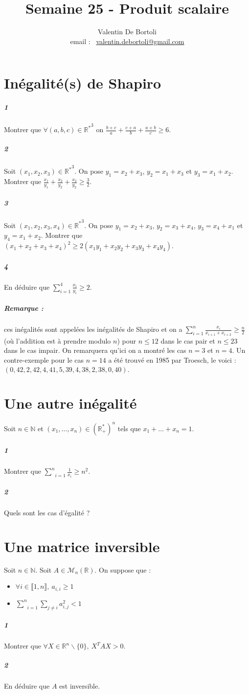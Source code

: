 \documentclass[10pt,a4paper]{article}
\title{Semaine 25 - Produit scalaire}
\author{Valentin De Bortoli \\ email : \ \href{mailto:valentin.debortoli@gmail.com}{valentin.debortoli@gmail.com}}
\date{}
\begin{document}
\maketitle
\section{Inégalité(s) de Shapiro}
\subparagraph{1}Montrer que $\forall (a,b,c) \in {\mathbb{R}^*}^3$ on  $\frac{b+c}{a}+\frac{c+a}{b}+\frac{a+b}{c} \ge 6$.
\subparagraph{2}Soit $(x_1,x_2,x_3)\in {\mathbb{R}^*}^3$. On pose $y_1=x_2+x_3$, $y_2=x_1+x_3$ et $y_3=x_1+x_2$. Montrer que $\frac{x_1}{y_1}+\frac{x_2}{y_2}+\frac{x_2}{y_2} \ge \frac{3}{2}$.
\subparagraph{3} Soit $(x_1,x_2,x_3,x_4)\in {\mathbb{R}^*}^3$. On pose $y_1=x_2+x_3$, $y_2=x_3+x_4$, $y_3=x_4+x_1$ et $y_4=x_1+x_2$. Montrer que $(x_1+x_2+x_3+x_4)^2 \ge 2(x_1 y_1+x_2 y_2 +x_3 y_3+x_4 y_4)$.
\subparagraph{4}En déduire que $\sum_{i=1}^4 \frac{x_i}{y_i} \ge 2$.
\subparagraph{Remarque :} ces inégalités sont appelées les inégalités de Shapiro et on a $\sum_{i=1}^n \frac{x_i}{x_{i+1}+x_{i+2}} \ge \frac{n}{2}$ (où l'addition est à prendre modulo $n$) pour $n \le 12 $ dans le cas pair et $n \le 23$ dans le cas impair. On remarquera qu'ici on a montré les cas $n=3$ et $n=4$. Un contre-exemple pour le cas $n=14$ a été trouvé en 1985 par Troesch, le voici : $(0, 42, 2, 42, 4, 41, 5, 39, 4, 38, 2, 38, 0, 40)$.

\section{Une autre inégalité}
Soit $n \in \mathbb{N}$ et $(x_1, \dots, x_n) \in \left( \mathbb{R}_+^* \right)^n$ tels que $x_1 + \dots + x_n = 1$.
\subparagraph{1}Montrer que $\underset{i=1}{\overset{n}{\sum}} \frac{1}{x_i} \ge n^2$.
\subparagraph{2}Quels sont les cas d'égalité ?
\section{Une matrice inversible}
Soit $n \in \mathbb{N}$. Soit $A \in \mathcal{M}_n\left( \mathbb{R} \right)$. On suppose que :
\begin{itemize}
\item $\forall i \in \llbracket 1,n \rrbracket, \ a_{i,i} \ge 1$
\item $\underset{i=1}{\overset{n}{\sum}} \underset{j \neq i}{\sum} a_{i,j}^2 <1$
\end{itemize}
\subparagraph{1}Montrer que $\forall X \in \mathbb{R}^n \backslash \lbrace 0 \rbrace, \ X^T A X > 0$.
\subparagraph{2}En déduire que $A$ est inversible.
\end{document}
